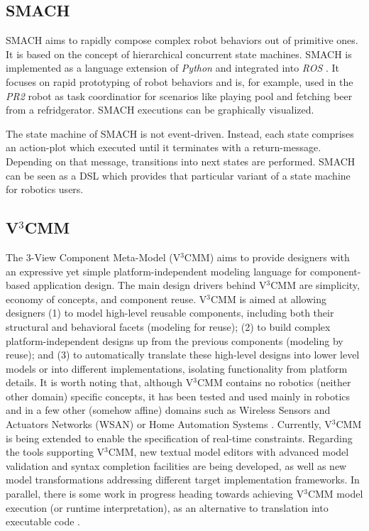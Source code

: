 \documentclass[jou]{apa}
\begin{document}
\subsection{SMACH}

SMACH \cite{Smach:2011ys} aims to rapidly compose complex robot behaviors out of primitive ones. It is based on the concept of hierarchical concurrent state machines. SMACH is implemented as a language extension of {\em Python} and integrated into {\em ROS} \cite{ros}. It focuses on rapid prototyping of robot behaviors and is, for example, used in the {\em PR2} robot as task coordinatior for scenarios like playing pool and fetching beer from a refridgerator. SMACH executions can be graphically visualized. 

The state machine of SMACH is not event-driven. Instead, each state comprises an action-plot which executed until it  terminates with a return-message. Depending on that message, transitions into next states are performed. SMACH can be seen as a DSL which provides that particular variant of a state machine for robotics users.

\subsection{V$^3$CMM}

The 3-View Component Meta-Model (V$^3$CMM) \cite{JOSER10} aims to provide designers with an expressive 
yet simple platform-independent modeling language for component-based application design. The main design 
drivers behind V$^3$CMM are simplicity, economy of concepts, and component reuse. V$^3$CMM is aimed at 
allowing designers (1) to model high-level reusable components, including both their structural and 
behavioral facets (modeling for reuse); (2) to build complex platform-independent designs up from the 
previous components (modeling by reuse); and (3) to automatically translate these high-level designs 
into lower level models or into different implementations, isolating functionality from platform  details. 
It is worth noting that, although V$^3$CMM contains no robotics (neither other domain) specific concepts, 
it has been tested and used mainly in robotics and in a few other (somehow affine) domains such as 
Wireless Sensors and Actuators Networks (WSAN) \cite{IJCIS07} or Home Automation Systems \cite{IEEESoftware09}. 
Currently, V$^3$CMM is being extended to enable the specification of real-time constraints. Regarding the 
tools supporting V$^3$CMM, new textual model editors with advanced model validation and syntax completion 
facilities are being developed, as well as new model transformations addressing different target implementation 
frameworks. In parallel, there is some work in progress heading towards achieving V$^3$CMM model execution 
(or runtime interpretation), as an alternative to translation into executable code \cite{ROSYM10}.



\end{document}
